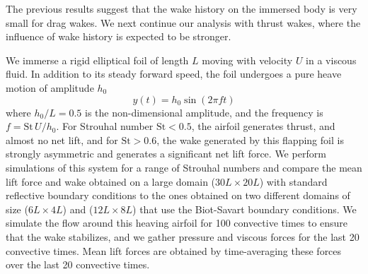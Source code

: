 \documentclass[final,1p,times]{elsarticle}
\begin{document}
The previous results suggest that the wake history on the immersed body is very small for drag wakes. We next continue our analysis with thrust wakes, where the influence of wake history is expected to be stronger.

We immerse a rigid elliptical foil of length $L$ moving with velocity $U$ in a viscous fluid. In addition to its steady forward speed, the foil undergoes a pure heave motion of amplitude $h_0$
\begin{equation}
    y(t) = h_0 \sin(2\pi f t)
\end{equation}
where $h_0/L=0.5$ is the non-dimensional amplitude, and the frequency is $f = \text{St}\,U/h_0$. For Strouhal number $\text{St}<0.5$, the airfoil generates thrust, and almost no net lift, and for $\text{St}>0.6$, the wake generated by this flapping foil is strongly asymmetric and generates a significant net lift force. We perform simulations of this system for a range of Strouhal numbers and compare the mean lift force and wake obtained on a large domain ($30L\times20L$) with standard reflective boundary conditions to the ones obtained on two different domains of size ($6L\times4L$) and ($12L\times8L$) that use the Biot-Savart boundary conditions. We simulate the flow around this heaving airfoil for 100 convective times to ensure that the wake stabilizes, and we gather pressure and viscous forces for the last 20 convective times. Mean lift forces are obtained by time-averaging these forces over the last 20 convective times.
\end{document}
